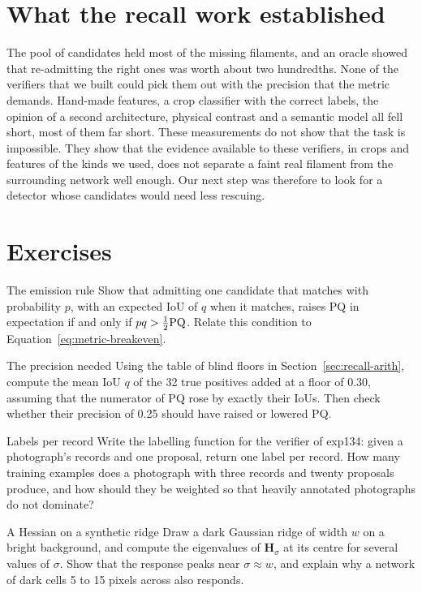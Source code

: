 \section{What the recall work established}\label{sec:recall-summary}
The pool of candidates held most of the missing filaments, and an oracle showed that re-admitting the
right ones was worth about two hundredths. None of the verifiers that we built could pick them out
with the precision that the metric demands. Hand-made features, a crop classifier with the correct
labels, the opinion of a second architecture, physical contrast and a semantic model all fell short,
most of them far short. These measurements do not show that the task is impossible. They show that
the evidence available to these verifiers, in crops and features of the kinds we used, does not
separate a faint real filament from the surrounding network well enough. Our next step was therefore
to look for a detector whose candidates would need less rescuing.

\section*{Exercises}
\begin{exercise}{The emission rule}
Show that admitting one candidate that matches with probability $p$, with an expected IoU of $q$ when
it matches, raises PQ in expectation if and only if $pq > \tfrac12\mathrm{PQ}$. Relate this condition to
Equation~\eqref{eq:metric-breakeven}.
\end{exercise}

\begin{exercise}{The precision needed}
Using the table of blind floors in Section~\ref{sec:recall-arith}, compute the mean IoU $q$ of the 32
true positives added at a floor of 0.30, assuming that the numerator of PQ rose by exactly their IoUs.
Then check whether their precision of 0.25 should have raised or lowered PQ.
\end{exercise}

\begin{exercise}{Labels per record}
Write the labelling function for the verifier of exp134: given a photograph's records and one
proposal, return one label per record. How many training examples does a photograph with three
records and twenty proposals produce, and how should they be weighted so that heavily annotated
photographs do not dominate?
\end{exercise}

\begin{exercise}{A Hessian on a synthetic ridge}
Draw a dark Gaussian ridge of width $w$ on a bright background, and compute the eigenvalues of
$\mathbf{H}_\sigma$ at its centre for several values of $\sigma$. Show that the response peaks near
$\sigma \approx w$, and explain why a network of dark cells 5 to 15 pixels across also responds.
\end{exercise}

